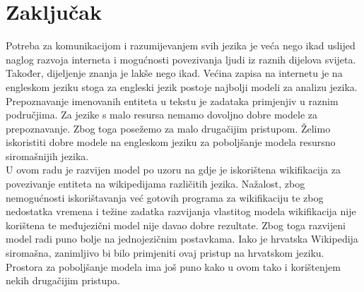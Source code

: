 \documentclass[times, utf8, seminar]{fer}
\begin{document}
\chapter{Zaključak}
Potreba za komunikacijom i razumijevanjem svih jezika je veća nego ikad uslijed naglog razvoja interneta i mogućnosti povezivanja ljudi iz raznih dijelova svijeta. Također, dijeljenje znanja je lakše nego ikad. Većina zapisa na internetu je na engleskom jeziku stoga za engleski jezik postoje najbolji modeli za analizu jezika. Prepoznavanje imenovanih entiteta u tekstu je zadataka primjenjiv u raznim područjima. Za jezike s malo resursa nemamo dovoljno dobre modele za prepoznavanje. Zbog toga posežemo za malo drugačijim pristupom. Želimo iskoristiti dobre modele na engleskom jeziku za poboljšanje modela resursno siromašnijih jezika.\\
\indent U ovom radu je razvijen model po uzoru na \citep{DBLP:conf/conll/TsaiMR16} gdje je iskorištena wikifikacija za povezivanje entiteta na wikipedijama različitih jezika. Nažalost, zbog nemogućnosti iskorištavanja već gotovih programa za wikifikaciju te zbog nedostatka vremena i težine zadatka razvijanja vlastitog modela wikifikacija nije korištena te međujezični model nije davao dobre rezultate. Zbog toga razvijeni model radi puno bolje na jednojezičnim postavkama. Iako je hrvatska Wikipedija siromašna, zanimljivo bi bilo primjeniti ovaj pristup na hrvatskom jeziku.\\
\indent Prostora za poboljšanje modela ima još puno kako u ovom  tako i korištenjem nekih drugačijim pristupa.



\nocite{*}
\end{document}
